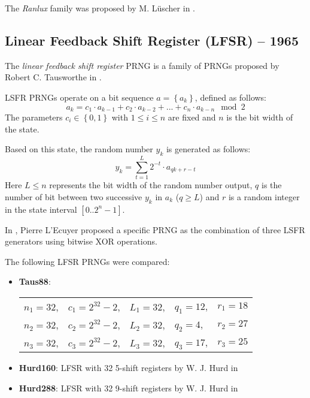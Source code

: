     The \textit{Ranlux} family was proposed by M. Lüscher in \cite{Luescher:1993}.

\subsection[Linear Feedback Shift Register (LFSR) -- 1965]{Linear Feedback Shift Register (LFSR) -- 1965} \label{subsec:lfsr}

    The \emph{linear feedback shift register} PRNG is a family of PRNGs proposed by Robert C. Tausworthe in \cite{Tausworthe:1965}.

    LSFR PRNGs operate on a bit sequence $a = \left\{a_k\right\}$, defined as follows:
    \begin{equation*}
        a_k = c_1 \cdot a_{k - 1} + c_2 \cdot a_{k - 2} + ... + c_n \cdot a_{k - n} \mod 2
    \end{equation*}
    The parameters $c_i \in \left\{0, 1\right\}$ with $1 \leq i \leq n$ are fixed and $n$ is the bit width of the state.

    Based on this state, the random number $y_k$ is generated as follows:
    \begin{equation*}
        y_k = \sum_{t = 1}^{L} 2^{-t} \cdot a_{qk + r - t}
    \end{equation*}
    Here $L \leq n$ represents the bit width of the random number output, $q$ is the number of bit between two successive $y_k$ in $a_k$ ($q \geq L$) and $r$ is a random integer in the state interval $\left[0 .. 2^n - 1\right]$.

    In \cite{LEcuyer:1996}, Pierre L'Ecuyer proposed a specific PRNG as the combination of three LSFR generators using bitwise XOR operations.

    The following LFSR PRNGs were compared:
    \begin{itemize}
        \itemsep0em
        \item \textbf{Taus88}:
            \begin{tabular}[t]{lllll}
                $n_1 = 32$, &$c_1 = 2^{32} - 2$, &$L_1 = 32$, &$q_1 = 12$, &$r_1 = 18$ \\
                $n_2 = 32$, &$c_2 = 2^{32} - 2$, &$L_2 = 32$, &$q_2 = 4$,  &$r_2 = 27$ \\
                $n_3 = 32$, &$c_3 = 2^{32} - 2$, &$L_3 = 32$, &$q_3 = 17$, &$r_3 = 25$
            \end{tabular}
        \item \textbf{Hurd160}: LFSR with 32 \SI{5}{\bit}-shift registers by W. J. Hurd in \cite{Hurd:1974}
        \item \textbf{Hurd288}: LFSR with 32 \SI{9}{\bit}-shift registers by W. J. Hurd in \cite{Hurd:1974}
    \end{itemize}

